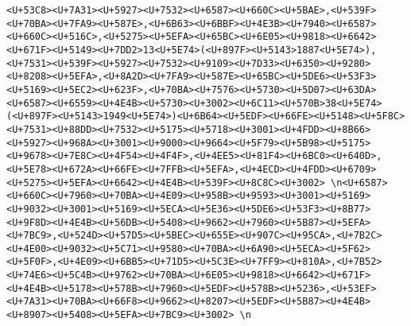 \documentclass[
]{article}
\begin{document}
\begin{verbatim}
<U+53C8><U+7A31><U+5927><U+7532><U+6587><U+660C><U+5BAE>,<U+539F><U+70BA><U+7FA9><U+587E>,<U+6B63><U+6BBF><U+4E3B><U+7940><U+6587><U+660C><U+516C>,<U+5275><U+5EFA><U+65BC><U+6E05><U+9818><U+6642><U+671F><U+5149><U+7DD2>13<U+5E74>(<U+897F><U+5143>1887<U+5E74>),<U+7531><U+539F><U+5927><U+7532><U+9109><U+7D33><U+6350><U+9280><U+8208><U+5EFA>,<U+8A2D><U+7FA9><U+587E><U+65BC><U+5DE6><U+53F3><U+5169><U+5EC2><U+623F>,<U+70BA><U+7576><U+5730><U+5D07><U+63DA><U+6587><U+6559><U+4E4B><U+5730><U+3002><U+6C11><U+570B>38<U+5E74>(<U+897F><U+5143>1949<U+5E74>)<U+6B64><U+5EDF><U+66FE><U+5148><U+5F8C><U+7531><U+88DD><U+7532><U+5175><U+5718><U+3001><U+4FDD><U+8B66><U+5927><U+968A><U+3001><U+9000><U+9664><U+5F79><U+5B98><U+5175><U+9678><U+7E8C><U+4F54><U+4F4F>,<U+4EE5><U+81F4><U+6BC0><U+640D>,<U+5E78><U+672A><U+66FE><U+7FFB><U+5EFA>,<U+4ECD><U+4FDD><U+6709><U+5275><U+5EFA><U+6642><U+4E4B><U+539F><U+8C8C><U+3002> \n<U+6587><U+660C><U+7960><U+70BA><U+4E09><U+958B><U+9593><U+3001><U+5169><U+9032><U+3001><U+5169><U+5ECA><U+5E36><U+5DE6><U+53F3><U+8B77><U+9F8D><U+4E4B><U+56DB><U+5408><U+9662><U+7960><U+5B87><U+5EFA><U+7BC9>,<U+524D><U+57D5><U+5BEC><U+655E><U+907C><U+95CA>,<U+7B2C><U+4E00><U+9032><U+5C71><U+9580><U+70BA><U+6A90><U+5ECA><U+5F62><U+5F0F>,<U+4E09><U+6BB5><U+71D5><U+5C3E><U+7FF9><U+810A>,<U+7B52><U+74E6><U+5C4B><U+9762><U+70BA><U+6E05><U+9818><U+6642><U+671F><U+4E4B><U+5178><U+578B><U+7960><U+5EDF><U+578B><U+5236>,<U+53EF><U+7A31><U+70BA><U+66F8><U+9662><U+8207><U+5EDF><U+5B87><U+4E4B><U+8907><U+5408><U+5EFA><U+7BC9><U+3002> \n

\end{verbatim}
\end{document}

